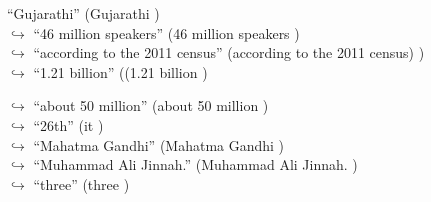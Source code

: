 \documentclass[11pt,a4paper, onecolumn]{article}
\begin{document}
\begin{figure}[t]
\begin{tcolorbox}[boxsep=0pt,left=5pt,right=0pt,top=2pt,colback = yellow!5]
\begin{dialogue}
{ ``Gujarathi'' (Gujarathi ) }
\\
\colorbox{pink!25}{$\hookrightarrow$}
{ ``46 million speakers'' (46 million speakers ) }
\\
\colorbox{pink!25}{$\hookrightarrow$}
{ ``according to the 2011 census'' (according to the 2011 census) ) }
\\
\colorbox{pink!25}{$\hookrightarrow$}
{ ``1.21 billion'' ((1.21 billion ) }
\\
 \end{dialogue}\end{tcolorbox}\end{figure}\begin{figure}[t] \small \begin{tcolorbox}[boxsep=0pt,left=5pt,right=0pt,top=2pt,colback = yellow!5] \begin{dialogue}
 \small 
\colorbox{pink!25}{$\hookrightarrow$}
{ ``about 50 million'' (about 50 million ) }
\\
\colorbox{pink!25}{$\hookrightarrow$}
{ ``26th'' (it ) }
\\
\colorbox{pink!25}{$\hookrightarrow$}
{ ``Mahatma Gandhi'' (Mahatma Gandhi ) }
\\
\colorbox{pink!25}{$\hookrightarrow$}
{ ``Muhammad Ali Jinnah.'' (Muhammad Ali Jinnah. ) }
\\
\colorbox{pink!25}{$\hookrightarrow$}
{ ``three'' (three ) }
\\
 \end{dialogue}\end{tcolorbox}\end{figure}
\end{document}
